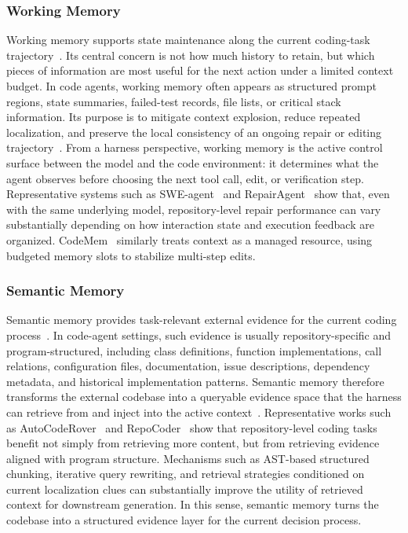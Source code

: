\subsubsection{Working Memory}
Working memory supports state maintenance along the current coding-task trajectory~\cite{huang2025language}. Its central concern is not how much history to retain, but which pieces of information are most useful for the next action under a limited context budget. In code agents, working memory often appears as structured prompt regions, state summaries, failed-test records, file lists, or critical stack information. Its purpose is to mitigate context explosion, reduce repeated localization, and preserve the local consistency of an ongoing repair or editing trajectory~\cite{yang2024swe,xia2025live,bouzenia2025repairagent,gaurav2025codemem}. 
From a harness perspective, working memory is the active control surface between the model and the code environment: it determines what the agent observes before choosing the next tool call, edit, or verification step. Representative systems such as SWE-agent~\cite{yang2024swe} and RepairAgent~\cite{bouzenia2025repairagent} show that, even with the same underlying model, repository-level repair performance can vary substantially depending on how interaction state and execution feedback are organized. CodeMem~\cite{gaurav2025codemem} similarly treats context as a managed resource, using budgeted memory slots to stabilize multi-step edits.



\subsubsection{Semantic Memory}
Semantic memory provides task-relevant external evidence for the current coding process~\cite{wu2025human,huang2026rethinking}. In code-agent settings, such evidence is usually repository-specific and program-structured, including class definitions, function implementations, call relations, configuration files, documentation, issue descriptions, dependency metadata, and historical implementation patterns. Semantic memory therefore transforms the external codebase into a queryable evidence space that the harness can retrieve from and inject into the active context~\cite{zhang2024autocoderover,zhang2024codeagent,biswal2026agentsm,zhang2025coderag,phan2025repohyper}. 
Representative works such as AutoCodeRover~\cite{zhang2024autocoderover} and RepoCoder~\cite{zhang2023repocoder} show that repository-level coding tasks benefit not simply from retrieving more content, but from retrieving evidence aligned with program structure. Mechanisms such as AST-based structured chunking, iterative query rewriting, and retrieval strategies conditioned on current localization clues can substantially improve the utility of retrieved context for downstream generation. In this sense, semantic memory turns the codebase into a structured evidence layer for the current decision process.





